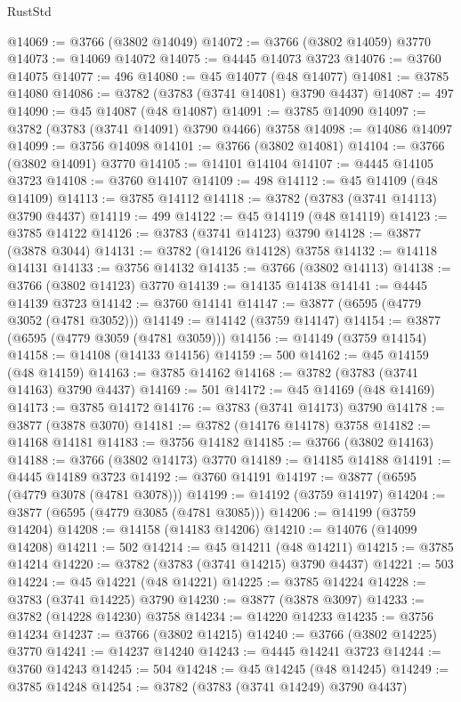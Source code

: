 \begin{lexlean}{RustStd}
\begin{coremodule}
@14069 := @3766 (@3802 @14049)
@14072 := @3766 (@3802 @14059) @3770
@14073 := @14069 @14072
@14075 := @4445 @14073 @3723
@14076 := @3760 @14075
@14077 := 496
@14080 := @45 @14077 (@48 @14077)
@14081 := @3785 @14080
@14086 := @3782 (@3783 (@3741 @14081) @3790 @4437)
@14087 := 497
@14090 := @45 @14087 (@48 @14087)
@14091 := @3785 @14090
@14097 := @3782 (@3783 (@3741 @14091) @3790 @4466) @3758
@14098 := @14086 @14097
@14099 := @3756 @14098
@14101 := @3766 (@3802 @14081)
@14104 := @3766 (@3802 @14091) @3770
@14105 := @14101 @14104
@14107 := @4445 @14105 @3723
@14108 := @3760 @14107
@14109 := 498
@14112 := @45 @14109 (@48 @14109)
@14113 := @3785 @14112
@14118 := @3782 (@3783 (@3741 @14113) @3790 @4437)
@14119 := 499
@14122 := @45 @14119 (@48 @14119)
@14123 := @3785 @14122
@14126 := @3783 (@3741 @14123) @3790
@14128 := @3877 (@3878 @3044)
@14131 := @3782 (@14126 @14128) @3758
@14132 := @14118 @14131
@14133 := @3756 @14132
@14135 := @3766 (@3802 @14113)
@14138 := @3766 (@3802 @14123) @3770
@14139 := @14135 @14138
@14141 := @4445 @14139 @3723
@14142 := @3760 @14141
@14147 := @3877 (@6595 (@4779 @3052 (@4781 @3052)))
@14149 := @14142 (@3759 @14147)
@14154 := @3877 (@6595 (@4779 @3059 (@4781 @3059)))
@14156 := @14149 (@3759 @14154)
@14158 := @14108 (@14133 @14156)
@14159 := 500
@14162 := @45 @14159 (@48 @14159)
@14163 := @3785 @14162
@14168 := @3782 (@3783 (@3741 @14163) @3790 @4437)
@14169 := 501
@14172 := @45 @14169 (@48 @14169)
@14173 := @3785 @14172
@14176 := @3783 (@3741 @14173) @3790
@14178 := @3877 (@3878 @3070)
@14181 := @3782 (@14176 @14178) @3758
@14182 := @14168 @14181
@14183 := @3756 @14182
@14185 := @3766 (@3802 @14163)
@14188 := @3766 (@3802 @14173) @3770
@14189 := @14185 @14188
@14191 := @4445 @14189 @3723
@14192 := @3760 @14191
@14197 := @3877 (@6595 (@4779 @3078 (@4781 @3078)))
@14199 := @14192 (@3759 @14197)
@14204 := @3877 (@6595 (@4779 @3085 (@4781 @3085)))
@14206 := @14199 (@3759 @14204)
@14208 := @14158 (@14183 @14206)
@14210 := @14076 (@14099 @14208)
@14211 := 502
@14214 := @45 @14211 (@48 @14211)
@14215 := @3785 @14214
@14220 := @3782 (@3783 (@3741 @14215) @3790 @4437)
@14221 := 503
@14224 := @45 @14221 (@48 @14221)
@14225 := @3785 @14224
@14228 := @3783 (@3741 @14225) @3790
@14230 := @3877 (@3878 @3097)
@14233 := @3782 (@14228 @14230) @3758
@14234 := @14220 @14233
@14235 := @3756 @14234
@14237 := @3766 (@3802 @14215)
@14240 := @3766 (@3802 @14225) @3770
@14241 := @14237 @14240
@14243 := @4445 @14241 @3723
@14244 := @3760 @14243
@14245 := 504
@14248 := @45 @14245 (@48 @14245)
@14249 := @3785 @14248
@14254 := @3782 (@3783 (@3741 @14249) @3790 @4437)

\end{coremodule}
\end{lexlean}
